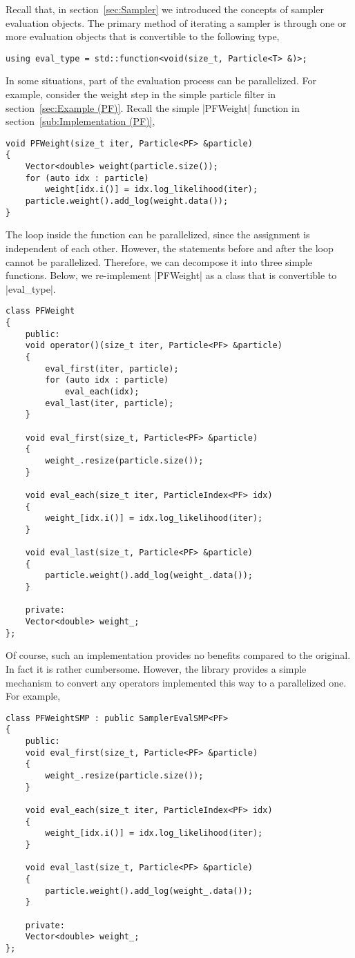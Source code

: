 Recall that, in section~\ref{sec:Sampler} we introduced the concepts of sampler
evaluation objects. The primary method of iterating a sampler is through
one or more evaluation objects that is convertible to the following type,
\begin{Verbatim}
using eval_type = std::function<void(size_t, Particle<T> &)>;
\end{Verbatim}
In some situations, part of the evaluation process can be parallelized. For
example, consider the weight step in the simple particle filter in
section~\ref{sec:Example (PF)}. Recall the simple |PFWeight| function in
section~\ref{sub:Implementation (PF)},
\begin{Verbatim}
void PFWeight(size_t iter, Particle<PF> &particle)
{
    Vector<double> weight(particle.size());
    for (auto idx : particle)
        weight[idx.i()] = idx.log_likelihood(iter);
    particle.weight().add_log(weight.data());
}
\end{Verbatim}
The loop inside the function can be parallelized, since the assignment is
independent of each other. However, the statements before and after the loop
cannot be parallelized. Therefore, we can decompose it into three simple
functions. Below, we re-implement |PFWeight| as a class that is convertible to
|eval_type|.
\begin{Verbatim}
class PFWeight
{
    public:
    void operator()(size_t iter, Particle<PF> &particle)
    {
        eval_first(iter, particle);
        for (auto idx : particle)
            eval_each(idx);
        eval_last(iter, particle);
    }

    void eval_first(size_t, Particle<PF> &particle)
    {
        weight_.resize(particle.size());
    }

    void eval_each(size_t iter, ParticleIndex<PF> idx)
    {
        weight_[idx.i()] = idx.log_likelihood(iter);
    }

    void eval_last(size_t, Particle<PF> &particle)
    {
        particle.weight().add_log(weight_.data());
    }

    private:
    Vector<double> weight_;
};
\end{Verbatim}
Of course, such an implementation provides no benefits compared to the
original. In fact it is rather cumbersome. However, the library provides a
simple mechanism to convert any operators implemented this way to a
parallelized one. For example,
\begin{Verbatim}
class PFWeightSMP : public SamplerEvalSMP<PF>
{
    public:
    void eval_first(size_t, Particle<PF> &particle)
    {
        weight_.resize(particle.size());
    }

    void eval_each(size_t iter, ParticleIndex<PF> idx)
    {
        weight_[idx.i()] = idx.log_likelihood(iter);
    }

    void eval_last(size_t, Particle<PF> &particle)
    {
        particle.weight().add_log(weight_.data());
    }

    private:
    Vector<double> weight_;
};
\end{Verbatim}
